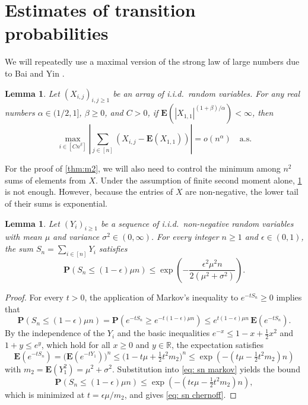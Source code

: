 \documentclass[12pt]{amsart}
\newtheorem{lemma}[theorem]{Lemma}
\newcommand{\R}{\mathbb{R}}
\renewcommand{\P}{\mathbf{P}}
\newcommand{\E}{\mathbf{E}}
\DeclareMathOperator{\1}{\mathbf{1}}
\newcommand{\eps}{\epsilon}
\begin{document}

\section{Estimates of transition probabilities}\label{sec: estimates}

We will repeatedly use a maximal version of the strong law of large numbers due to Bai and Yin \cite[Lemma 2]{MR1235416}.

\begin{lemma}\label{lem:bai yin}
Let $(X_{i,j})_{i, j \geq 1}$ be an array of i.i.d.\ random variables. For any real numbers $\alpha \in (1/2,1]$, $\beta \geq 0$, and $C > 0$, if $\E(|X_{1,1}|^{(1+\beta)/\alpha}) < \infty$, then
\[
		\max_{i \in [Cn^\beta]} \left| \sum_{j \in [n]} (X_{i,j} - \E (X_{1,1})) \right| = o(n^{\alpha}) \quad \mathrm{a.s.}
\]
\end{lemma}

For the proof of \cref{thm:m2}, we will also need to control the minimum among $n^2$ sums of elements from $X$. Under the assumption of finite second moment alone, \cref{lem:bai yin} is not enough. However, because the entries of $X$ are non-negative, the lower tail of their sums is exponential.

\begin{lemma}\label{lem:lower tail chernoff}
Let $(Y_i)_{i \geq 1}$ be a sequence of i.i.d.\ non-negative random variables with mean $\mu$ and variance $\sigma^2 \in (0,\infty)$. For every integer $n \geq 1$ and $\eps \in (0,1)$, the sum $S_n = \sum_{i \in [n]} Y_i$ satisfies
\begin{equation}\label{eq: sn chernoff}
    \P (S_n \leq (1-\eps) \mu n) \leq \exp \left(- \frac{\eps^2 \mu^2 n}{2(\mu^2 + \sigma^2) } \right).
\end{equation}
\end{lemma}

\begin{proof}
For every $t > 0$, the application of Markov's inequality to $e^{-t S_n} \geq 0$ implies that
\begin{equation}\label{eq: sn markov}
	\P (S_n \leq (1-\eps)\mu n) = \P \left(e^{-t S_n} \geq e^{-t (1-\eps) \mu n} \right) \leq e^{t(1-\eps) \mu n}\, \E (e^{-t S_n}).
\end{equation}
By the independence of the $Y_i$ and the basic inequalities $e^{-x} \leq 1 - x + \frac12 x^2$ and $1+y \leq e^y$, which hold for all $x \geq 0$ and $y \in \R$, the expectation satisfies
\[
	\E (e^{-t S_n}) = \big( \E (e^{-tY_1}) \big)^n \leq \big(1 - t \mu + \tfrac12 t^2 m_2 \big)^n \leq \exp \left(- (t \mu - \tfrac12 t^2 m_2)n \right)	
\]
with $m_2 = \E(Y_1^2) = \mu^2 + \sigma^2$. Substitution into \cref{eq: sn markov} yields the bound
\[
	\P (S_n \leq (1-\eps) \mu n) \leq \exp \left( - (t \eps \mu - \tfrac12 t^2 m_2 )n \right),
\]
which is minimized at $t = \eps \mu /m_2$, and gives \cref{eq: sn chernoff}.
\end{proof}
\end{document}
